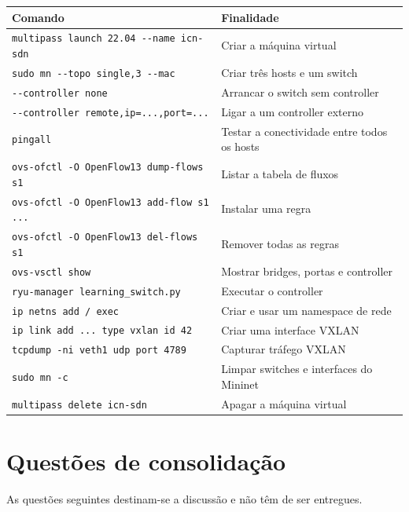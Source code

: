 \documentclass[11pt,a4paper]{article}
\newcommand{\cmd}[1]{\texttt{#1}}
\begin{document}
\begin{center}
\small
\begin{tabular}{>{\raggedright\arraybackslash}p{7.2cm} >{\raggedright\arraybackslash}p{7.6cm}}
\toprule
\textbf{Comando} & \textbf{Finalidade} \\
\midrule
\cmd{multipass launch 22.04 -{}-name icn-sdn} & Criar a máquina virtual \\
\cmd{sudo mn -{}-topo single,3 -{}-mac} & Criar três hosts e um switch \\
\cmd{-{}-controller none} & Arrancar o switch sem controller \\
\cmd{-{}-controller remote,ip=...,port=...} & Ligar a um controller externo \\
\cmd{pingall} & Testar a conectividade entre todos os hosts \\
\cmd{ovs-ofctl -O OpenFlow13 dump-flows s1} & Listar a tabela de fluxos \\
\cmd{ovs-ofctl -O OpenFlow13 add-flow s1 ...} & Instalar uma regra \\
\cmd{ovs-ofctl -O OpenFlow13 del-flows s1} & Remover todas as regras \\
\cmd{ovs-vsctl show} & Mostrar bridges, portas e controller \\
\cmd{ryu-manager learning\_switch.py} & Executar o controller \\
\cmd{ip netns add / exec} & Criar e usar um namespace de rede \\
\cmd{ip link add ... type vxlan id 42} & Criar uma interface VXLAN \\
\cmd{tcpdump -ni veth1 udp port 4789} & Capturar tráfego VXLAN \\
\cmd{sudo mn -c} & Limpar switches e interfaces do Mininet \\
\cmd{multipass delete icn-sdn} & Apagar a máquina virtual \\
\bottomrule
\end{tabular}
\end{center}

\section*{Questões de consolidação}

As questões seguintes destinam-se a discussão e não têm de ser entregues.
\end{document}
